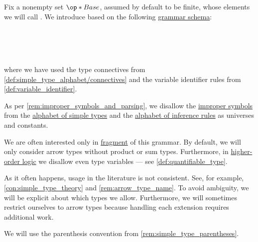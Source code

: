 \begin{definition}\label{def:simple_type}\mimprovised
  Fix a nonempty set \( \op*{Base} \), assumed by default to be finite, whose elements we will call . We introduce  based on the following \hyperref[def:formal_grammar/schema]{grammar schema}:
  \begin{bnf*}
       {} \\
         { \bnfor {}} \\
     {\bnftsq{(} \bnfsp {} \bnfsp {} \bnfsp {} \bnfsp \bnftsq{)}} \\
                { \bnfor {}}
  \end{bnf*}
  where we have used the type connectives from \cref{def:simple_type_alphabet/connectives} and the variable identifier rules from \cref{def:variable_identifier}.

  As per \cref{rem:improper_symbols_and_parsing}, we disallow the \hyperref[con:improper_symbol]{improper symbols} from the \hyperref[def:simple_type_alphabet]{alphabet of simple types} and the \hyperref[def:inference_rule_alphabet]{alphabet of inference rules} as universes and constants.

  We are often interested only in \hyperref[con:syntax_fragment]{fragment} of this grammar. By default, we will only consider arrow types without product or sum types. Furthermore, in \hyperref[def:higher_order_logic]{higher-order logic} we disallow even type variables --- see \cref{def:quantifiable_type}.
\end{definition}
\begin{comments}
  \item As it often happens, usage in the literature is not consistent. See, for example, \cref{con:simple_type_theory} and \cref{rem:arrow_type_name}. To avoid ambiguity, we will be explicit about which types we allow. Furthermore, we will sometimes restrict ourselves to arrow types because handling each extension requires additional work.

  \item We will use the parenthesis convention from \cref{rem:simple_type_parentheses}.
\end{comments}

